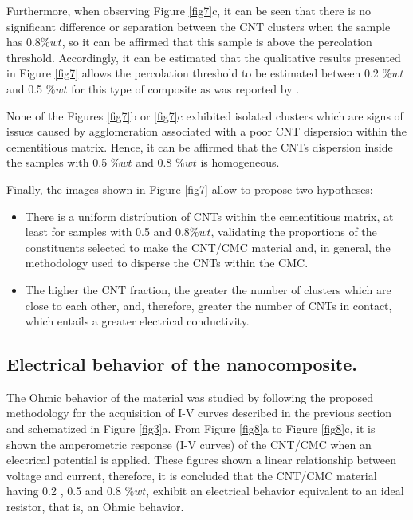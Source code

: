 \documentclass[twocolumn]{bmcart}%
\begin{document}
Furthermore, when observing Figure \ref{fig7}c, it can be seen that there is no significant difference or separation between the CNT clusters when the sample has 0.8$\%wt$, so it can be affirmed that this sample is above the percolation threshold. Accordingly, it can be estimated that the qualitative results presented in Figure \ref{fig7} allows the percolation threshold to be estimated between 0.2 $\%wt$ and 0.5 $\%wt$ for this type of composite as was reported by \cite{Souri2017, Garcia-Macias2017, Hoseini2017}. 

None of the Figures \ref{fig7}b or \ref{fig7}c exhibited isolated clusters which are signs of issues caused by agglomeration associated with a poor CNT dispersion within the cementitious matrix. Hence, it can be affirmed that the CNTs dispersion inside the samples with 0.5 $\%wt$ and 0.8 $\%wt$ is homogeneous. 

Finally, the images shown in Figure \ref{fig7} allow to propose two hypotheses:

\begin{itemize}
    

\item  There is a uniform distribution of CNTs within the cementitious matrix, at least for samples with 0.5  and 0.8$\%wt$, validating the proportions of the constituents selected to make the CNT/CMC material and, in general, the methodology used to disperse the CNTs within the CMC.
\item 	The higher the CNT fraction, the greater the number of clusters which are close to each other, and, therefore, greater the number of CNTs in contact, which entails a greater electrical conductivity.

\end{itemize}



\subsection{Electrical behavior of the nanocomposite.}

The Ohmic behavior of the material was studied by following the proposed methodology for the acquisition of I-V curves described in the previous section and schematized in Figure \ref{fig3}a. From Figure \ref{fig8}a to Figure \ref{fig8}c, it is shown the amperometric response (I-V curves) of the CNT/CMC when an electrical potential is applied. These figures shown a linear relationship between voltage and current, therefore, it is concluded that the CNT/CMC material having 0.2 , 0.5 and 0.8 $\%wt$, exhibit an electrical behavior equivalent to an ideal resistor, that is, an Ohmic behavior.
\end{document}
